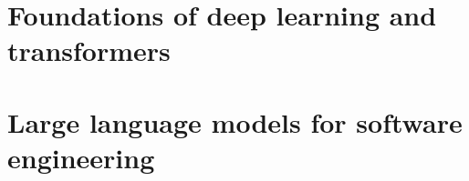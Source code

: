 \documentclass[11pt,a4paper,oneside,openany]{book}
\begin{document}
\frontmatter

\tableofcontents

\mainmatter

\part{Foundations of deep learning and transformers}




% 
% 

\part{Large language models for software engineering}

% 
% 
% 
% 
% 

\backmatter


\end{document}
